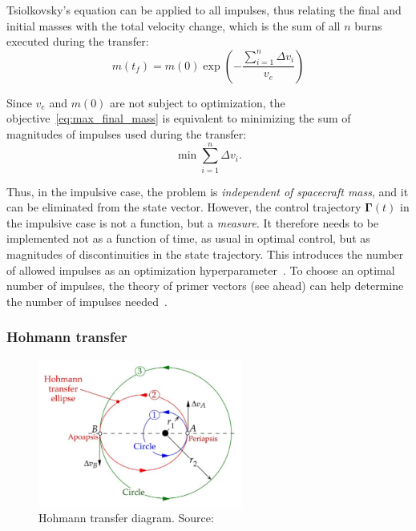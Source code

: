Tsiolkovsky's equation can be applied to all impulses, thus relating the final and initial masses with the total velocity change, which is the sum of all \(n\) burns executed during the transfer:
\begin{equation}
    m(t_f) = m(0) \exp{\left(-\frac{\sum_{i=1}^{n}\Delta v_i}{v_e}\right)}
\end{equation}

Since \(v_e\) and \(m(0)\) are not subject to optimization, the objective~\eqref{eq:max_final_mass} is equivalent to minimizing the sum of magnitudes of impulses used during the transfer:
\begin{equation}
    \min \sum_{i=1}^{n} \Delta v_i.
\end{equation}

Thus, in the impulsive case, the problem is \textit{independent of spacecraft mass}, and it can be eliminated from the state vector. However, the control trajectory \(\mathbf{\Gamma}(t)\) in the impulsive case is not a function, but a \textit{measure}. It therefore needs to be implemented not as a function of time, as usual in optimal control, but as magnitudes of discontinuities in the state trajectory. This introduces the number of allowed impulses as an optimization hyperparameter~\cite{optimal_impulsive_control}. To choose an optimal number of impulses, the theory of primer vectors (see ahead) can help determine the number of impulses needed~\cite{interactive_primer_vector}.

\subsubsection{Hohmann transfer}

\begin{figure}[htbp]
    \centering
    \includegraphics[width=0.6\textwidth]{img/hohmann_from_curtis.png}
    \caption{Hohmann transfer diagram. Source: \cite{curtis2015orbital}}
    \label{fig:hohmann_diagram}
\end{figure}

